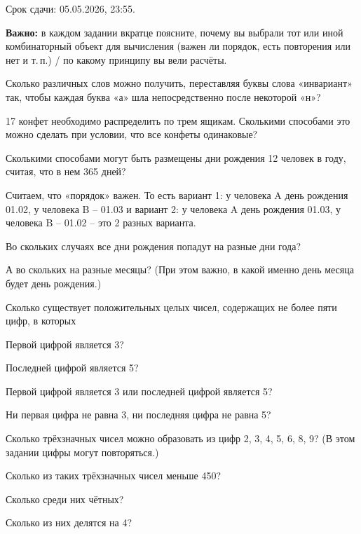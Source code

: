 \documentclass[a4paper,12pt,oneside]{article}
\begin{document}
\noindent Срок сдачи: 05.05.2026, 23:55.\hfill
{}

\medskip\noindent\textbf{Важно:} в каждом задании вкратце поясните, почему вы выбрали тот или иной комбинаторный объект для вычисления (важен ли порядок, есть повторения или нет и т.\,п.) / по какому принципу вы вели расчёты.

Сколько различных слов можно получить, переставляя буквы слова «инвариант» так, чтобы каждая буква «а» шла непосредственно после некоторой «н»?

17 конфет необходимо распределить по трем ящикам. Сколькими способами это можно сделать при условии, что все конфеты одинаковые?

Сколькими способами могут быть размещены дни рождения 12 человек в году, считая, что в нем 365 дней?

Считаем, что «порядок» важен. То есть вариант 1: у человека A день рождения 01.02, у человека B -- 01.03 и вариант 2: у человека A день рождения 01.03, у человека B -- 01.02 -- это 2 разных варианта.
\begin{alphlist}
  \item Во скольких случаях все дни рождения попадут на разные дни года?
  \item А во скольких на разные месяцы? (При этом важно, в какой именно день месяца будет день рождения.)
\end{alphlist}

Сколько существует положительных целых чисел, содержащих не более пяти цифр, в которых
\begin{alphlist}
  \item Первой цифрой является 3?
  \item Последней цифрой является 5?
  \item Первой цифрой является 3 или последней цифрой является 5?
  \item Ни первая цифра не равна 3, ни последняя цифра не равна 5?
\end{alphlist}

Сколько трёхзначных чисел можно образовать из цифр 2, 3, 4, 5, 6, 8, 9? (В этом задании цифры могут повторяться.)
\begin{alphlist}
  \item Сколько из таких трёхзначных чисел меньше 450?
  \item Сколько среди них чётных?
  \item Сколько из них делятся на 4?
\end{alphlist}
\end{document}
